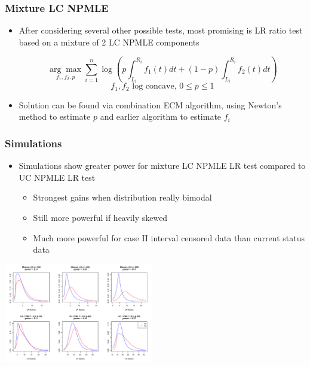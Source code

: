 \documentclass[compress,red]{beamer}
\begin{document}
\begin{frame}

	\frametitle{Mixture LC NPMLE}

	\begin{itemize}

	\item After considering several other possible tests, most promising is LR ratio test based on a mixture of 2 LC NPMLE components
	
	\[
	\underset {f_1, f_2, p}{\arg \max} \displaystyle \sum_{i = 1}^n \log( p \int_{L_i}^{R_i} f_1(t) dt + (1-p) \int_{L_i}^{R_i}f_2(t)dt)
	\]
	\[	
	 f_1, f_2 \text{ log concave, } 0 \leq p \leq 1
	 \]

	\item Solution can be found via combination ECM algorithm, using Newton's method to estimate $p$ and earlier algorithm to estimate $f_i$

	\end{itemize}


\end{frame}

\begin{frame}

	\frametitle{Simulations}

	\begin{itemize}
	
	\item Simulations show greater power for mixture LC NPMLE LR test compared to UC NPMLE LR test
	
		\begin{itemize}
		
		\item Strongest gains when distribution really bimodal 
		
		\item Still more powerful if heavily skewed
				
		\item Much more powerful for case II interval censored data than current status data
		
		\end{itemize}
	
	\end{itemize}

\centerline{ \includegraphics[width = 6.5cm]{LRplots.pdf} }

\end{frame}
\end{document}
